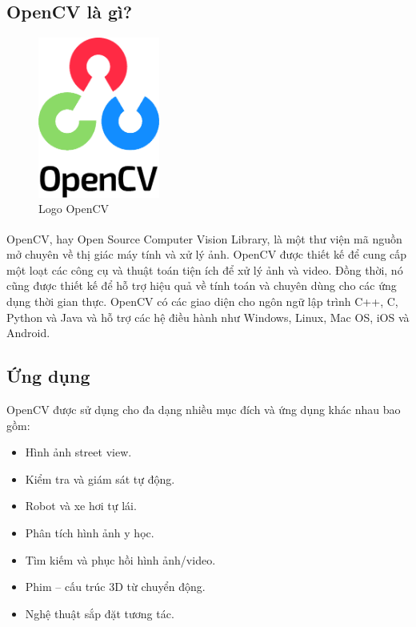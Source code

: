 \subsection{OpenCV là gì?}
\begin{figure}[!hbt]
\begin{center}
    \includegraphics[width=4cm]{img/2_Theory/opencv.png}
    \caption{Logo OpenCV}
\end{center}
\end{figure}
\tab OpenCV\textsuperscript{\cite{opencv}}, hay Open Source Computer Vision Library, là một thư viện mã nguồn mở chuyên về thị giác máy tính và xử lý ảnh. OpenCV được thiết kế để cung cấp một loạt các công cụ và thuật toán tiện ích để xử lý ảnh và video. Đồng thời, nó cũng được thiết kế để hỗ trợ hiệu quả về tính toán và chuyên dùng cho các ứng dụng thời gian thực. OpenCV có các giao diện cho ngôn ngữ lập trình C++, C, Python và Java và hỗ trợ các hệ điều hành như Windows, Linux, Mac OS, iOS và Android. 
\subsection{Ứng dụng}
\tab OpenCV được sử dụng cho đa dạng nhiều mục đích và ứng dụng khác nhau bao gồm: 
\begin{itemize}
    \item Hình ảnh street view.
    \item Kiểm tra và giám sát tự động.
    \item Robot và xe hơi tự lái.
    \item Phân tích hình ảnh y học.
    \item Tìm kiếm và phục hồi hình ảnh/video.
    \item Phim – cấu trúc 3D từ chuyển động.
    \item Nghệ thuật sắp đặt tương tác.
\end{itemize}
